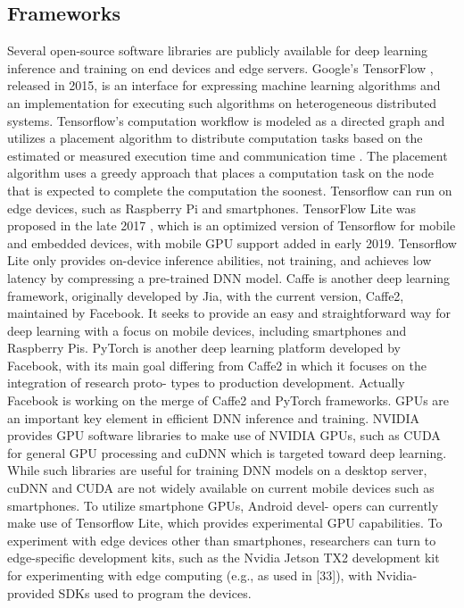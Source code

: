 \subsection{Frameworks}
Several open-source software libraries are publicly available for deep learning inference and training on end devices and edge servers. Google’s TensorFlow \cite{tensorflow2015-whitepaper}, released in 2015, is an interface for expressing machine learning algorithms and an implementation for executing such algorithms on heterogeneous distributed systems. Tensorflow's computation workflow is modeled as a directed graph and utilizes a placement algorithm to distribute computation tasks based on the estimated or measured execution time and communication time \cite{abadi2016tensorflow}. The placement algorithm uses a greedy approach that places a computation task on the node that is expected to complete the computation the soonest. Tensorflow can run on edge devices, such as Raspberry Pi and smartphones. TensorFlow Lite was proposed in the late 2017 \cite{tensorflowlite}, which is an optimized version of Tensorflow for mobile and embedded devices, with mobile GPU support added in early 2019. 
Tensorflow Lite only provides on-device inference abilities, not training, and achieves low latency by compressing a pre-trained DNN model.
Caffe \cite{Caffe} is another deep learning framework, originally developed by Jia, with the current version, Caffe2, maintained by Facebook. It seeks to provide an easy and straightforward way for deep learning with a focus on mobile devices, including smartphones and Raspberry Pis. PyTorch \cite{NEURIPS2019_9015} is another deep learning platform developed by Facebook, with its main goal differing from Caffe2 in which it focuses on the integration of research proto- types to production development. Actually Facebook is working on the merge of Caffe2 and PyTorch frameworks.
GPUs are an important key element in efficient DNN inference and training. NVIDIA provides GPU software libraries to make use of NVIDIA GPUs, such as CUDA \cite{CUDA} for general GPU processing and cuDNN \cite{cuDNN} which is targeted toward deep learning. While such libraries are useful for training DNN models on a desktop server, cuDNN and CUDA are not widely available on current mobile devices such as smartphones. To utilize smartphone GPUs, Android devel- opers can currently make use of Tensorflow Lite, which provides experimental GPU capabilities. To experiment with edge devices other than smartphones, researchers can turn to edge-specific development kits, such as the Nvidia Jetson TX2 development kit for experimenting with edge computing (e.g., as used in [33]), with Nvidia-provided SDKs used to program the devices.



